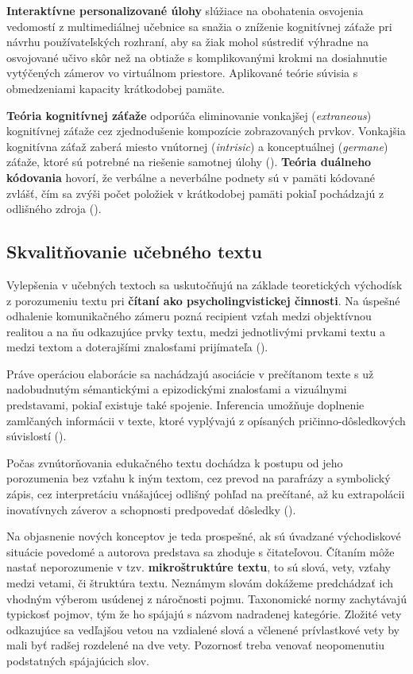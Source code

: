 \textbf{Interaktívne personalizované úlohy} slúžiace na obohatenia osvojenia vedomostí z multimediálnej učebnice sa snažia o zníženie kognitívnej záťaže pri návrhu používateľských rozhraní, aby sa žiak mohol sústrediť výhradne na osvojované učivo skôr než na obtiaže s komplikovanými krokmi na dosiahnutie vytýčených zámerov vo virtuálnom priestore. Aplikované teórie súvisia s obmedzeniami kapacity krátkodobej pamäte. 

\textbf{Teória kognitívnej záťaže} odporúča eliminovanie vonkajšej (\emph{extraneous}) kognitívnej záťaže cez zjednodušenie kompozície zobrazovaných prvkov. Vonkajšia kognitívna záťaž zaberá miesto vnútornej (\emph{intrisic}) a konceptuálnej (\emph{germane}) záťaže, ktoré sú potrebné na riešenie samotnej úlohy (\cite{uhercik_vyznam_2012}). \textbf{Teória duálneho kódovania} hovorí, že verbálne a neverbálne podnety sú v pamäti kódované zvlášť, čím sa zvýši počet položiek v krátkodobej pamäti pokiaľ pochádzajú z odlišného zdroja (\cite{mishra_interactive_2005}).

\subsection{Skvalitňovanie učebného textu}
Vylepšenia v učebných textoch sa uskutočňujú na základe teoretických východísk z porozumeniu textu pri \textbf{čítaní ako psycholingvistickej činnosti}. Na úspešné odhalenie komunikačného zámeru pozná recipient vzťah medzi objektívnou realitou a na ňu odkazujúce prvky textu, medzi jednotlivými prvkami textu a medzi textom a doterajšími znalosťami prijímateľa (\cite{gavora_ziak_1992}). 

Práve operáciou elaborácie sa nachádzajú asociácie v prečítanom texte s už nadobudnutým sémantickými a epizodickými znalosťami a vizuálnymi predstavami, pokiaľ existuje také spojenie. Inferencia umožňuje doplnenie zamlčaných informácii v texte, ktoré vyplývajú z opísaných pričinno-dôsledkových súvislostí (\cite{gavora_ziak_1992}).

Počas zvnútorňovania edukačného textu dochádza k postupu od jeho porozumenia bez vzťahu k iným textom, cez prevod na parafrázy a symbolický zápis, cez interpretáciu vnášajúcej odlišný pohľad na prečítané, až ku extrapolácii inovatívnych záverov a schopnosti predpovedať dôsledky (\cite{gavora_ziak_1992}). 

Na objasnenie nových konceptov je teda prospešné, ak sú úvadzané východiskové situácie povedomé a autorova predstava sa zhoduje s čitateľovou. Čítaním môže nastať neporozumenie v tzv. \textbf{mikroštruktúre textu}, to sú slová, vety, vzťahy medzi vetami, či štruktúra textu. Neznámym slovám dokážeme predchádzať ich vhodným výberom usúdenej z náročnosti pojmu. Taxonomické normy zachytávajú typickosť pojmov, tým že ho spájajú s názvom nadradenej kategórie. Zložité vety odkazujúce sa vedľajšou vetou na vzdialené slová a včlenené prívlastkové vety by mali byť radšej rozdelené na dve vety. Pozornosť treba venovať neopomenutiu podstatných spájajúcich slov. 

